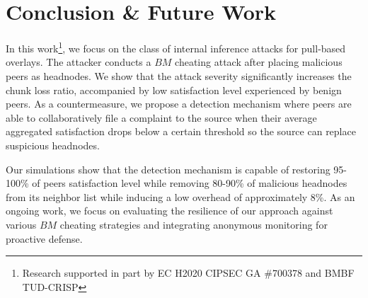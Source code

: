 \section{Conclusion \& Future Work}
\label{sec:conclusion}
In this work\footnote{Research supported in part by EC H2020 CIPSEC GA \#700378 and BMBF TUD-CRISP}, we focus on the class of internal inference attacks for pull-based overlays. The attacker conducts a $BM$ cheating attack after placing malicious peers as headnodes.
We show that the attack severity significantly increases the chunk loss ratio, accompanied by low satisfaction level experienced by benign peers.
As a countermeasure, we propose a detection mechanism where peers are able to collaboratively file a complaint to the source when their average aggregated satisfaction drops below a certain threshold so the source can replace suspicious headnodes.

Our simulations show that the detection mechanism is capable of restoring 95-100\% of peers satisfaction level while removing 80-90\% of malicious headnodes from its neighbor list while inducing a low overhead of approximately 8\%.
As an ongoing work, we focus on evaluating the resilience of our approach against various $BM$ cheating strategies and integrating anonymous monitoring for proactive defense.
